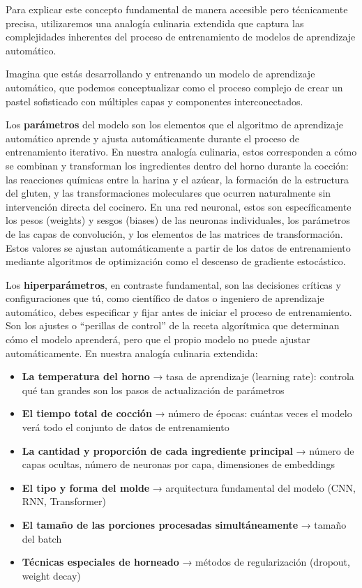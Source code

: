 Para explicar este concepto fundamental de manera accesible pero técnicamente precisa, utilizaremos una analogía culinaria extendida que captura las complejidades inherentes del proceso de entrenamiento de modelos de aprendizaje automático.

Imagina que estás desarrollando y entrenando un modelo de aprendizaje automático, que podemos conceptualizar como el proceso complejo de crear un pastel sofisticado con múltiples capas y componentes interconectados.

Los \textbf{parámetros} del modelo son los elementos que el algoritmo de aprendizaje automático aprende y ajusta automáticamente durante el proceso de entrenamiento iterativo. En nuestra analogía culinaria, estos corresponden a cómo se combinan y transforman los ingredientes dentro del horno durante la cocción: las reacciones químicas entre la harina y el azúcar, la formación de la estructura del gluten, y las transformaciones moleculares que ocurren naturalmente sin intervención directa del cocinero. En una red neuronal, estos son específicamente los pesos (weights) y sesgos (biases) de las neuronas individuales, los parámetros de las capas de convolución, y los elementos de las matrices de transformación. Estos valores se ajustan automáticamente a partir de los datos de entrenamiento mediante algoritmos de optimización como el descenso de gradiente estocástico.

Los \textbf{hiperparámetros}, en contraste fundamental, son las decisiones críticas y configuraciones que tú, como científico de datos o ingeniero de aprendizaje automático, debes especificar y fijar antes de iniciar el proceso de entrenamiento. Son los ajustes o ``perillas de control'' de la receta algorítmica que determinan cómo el modelo aprenderá, pero que el propio modelo no puede ajustar automáticamente. En nuestra analogía culinaria extendida:

\begin{itemize}
    \item \textbf{La temperatura del horno} → tasa de aprendizaje (learning rate): controla qué tan grandes son los pasos de actualización de parámetros
    \item \textbf{El tiempo total de cocción} → número de épocas: cuántas veces el modelo verá todo el conjunto de datos de entrenamiento
    \item \textbf{La cantidad y proporción de cada ingrediente principal} → número de capas ocultas, número de neuronas por capa, dimensiones de embeddings
    \item \textbf{El tipo y forma del molde} → arquitectura fundamental del modelo (CNN, RNN, Transformer)
    \item \textbf{El tamaño de las porciones procesadas simultáneamente} → tamaño del batch
    \item \textbf{Técnicas especiales de horneado} → métodos de regularización (dropout, weight decay)
\end{itemize}

